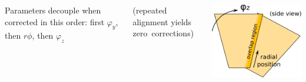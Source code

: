 \documentclass[compress]{beamer}
\begin{document}
\begin{frame}
\vspace{-1 cm}
\begin{columns}

\vspace{0.4 cm}
Parameters decouple when corrected in this order: first $\varphi_y$, then $r\phi$, then $\varphi_z$

\vspace{0.1 cm}
(repeated alignment yields \mbox{zero corrections)\hspace{-1 cm}}

\includegraphics[width=\linewidth]{sideview.png}
\end{columns}
\end{frame}
\end{document}
